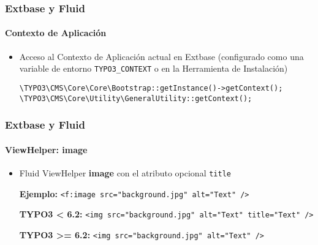 
\begin{frame}[fragile]
	\frametitle{Extbase y Fluid}
	\framesubtitle{Contexto de Aplicación}

	\begin{itemize}
		\item Acceso al Contexto de Aplicación actual en Extbase\newline
			(configurado como una variable de entorno \texttt{TYPO3\_CONTEXT} o en la Herramienta de Instalación)\newline

			\lstinline!\TYPO3\CMS\Core\Core\Bootstrap::getInstance()->getContext();!
			\lstinline!\TYPO3\CMS\Core\Utility\GeneralUtility::getContext();!

	\end{itemize}

\end{frame}


\begin{frame}[fragile]
	\frametitle{Extbase y Fluid}
	\framesubtitle{ViewHelper: image}

	\begin{itemize}
		\item Fluid ViewHelper \textbf{image} con el atributo opcional \texttt{title}\newline

			\smaller\textbf{Ejemplo:}\normalsize\newline
			\lstinline!<f:image src="background.jpg" alt="Text" />!
			\newline

			\smaller\textbf{TYPO3 < 6.2:}\normalsize\newline
			\lstinline!<img src="background.jpg" alt="Text" title="Text" />!
			\newline

			\smaller\textbf{TYPO3 >= 6.2:}\normalsize\newline
			\lstinline!<img src="background.jpg" alt="Text" />!

	\end{itemize}

\end{frame}

